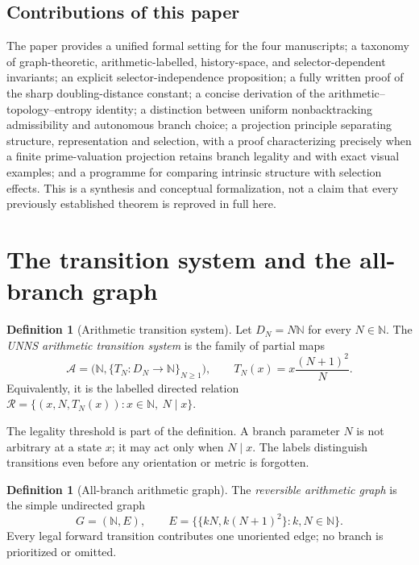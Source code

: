 \documentclass[11pt,a4paper]{article}
\theoremstyle{definition}\newtheorem{definition}[theorem]{Definition}
\newcommand{\N}{\mathbb N}
\newcommand{\A}{\mathcal A}
\begin{document}
\subsection{Contributions of this paper}
The paper provides a unified formal setting for the four manuscripts; a taxonomy of graph-theoretic, arithmetic-labelled, history-space, and selector-dependent invariants; an explicit selector-independence proposition; a fully written proof of the sharp doubling-distance constant; a concise derivation of the arithmetic--topology--entropy identity; a distinction between uniform nonbacktracking admissibility and autonomous branch choice; a projection principle separating structure, representation and selection, with a proof characterizing precisely when a finite prime-valuation projection retains branch legality and with exact visual examples; and a programme for comparing intrinsic structure with selection effects. This is a synthesis and conceptual formalization, not a claim that every previously established theorem is reproved in full here.

\section{The transition system and the all-branch graph}
\label{sec:base}
\begin{definition}[Arithmetic transition system]\label{def:A}
Let $D_N=N\N$ for every $N\in\N$. The \emph{UNNS arithmetic transition system} is the family of partial maps
\begin{equation}\label{eq:A}
\A=\bigl(\N,\{T_N:D_N\longrightarrow\N\}_{N\geq1}\bigr),\qquad
T_N(x)=x\frac{(N+1)^2}{N}.
\end{equation}
Equivalently, it is the labelled directed relation
$\mathcal R=\{(x,N,T_N(x)):x\in\N,\ N\mid x\}$.
\end{definition}

The legality threshold is part of the definition. A branch parameter $N$ is not arbitrary at a state $x$; it may act only when $N\mid x$. The labels distinguish transitions even before any orientation or metric is forgotten.

\begin{definition}[All-branch arithmetic graph]\label{def:G}
The \emph{reversible arithmetic graph} is the simple undirected graph
\begin{equation}\label{eq:G}
G=(\N,E),\qquad
E=\bigl\{\{kN,k(N+1)^2\}:k,N\in\N\bigr\}.
\end{equation}
Every legal forward transition contributes one unoriented edge; no branch is prioritized or omitted.
\end{definition}
\end{document}
